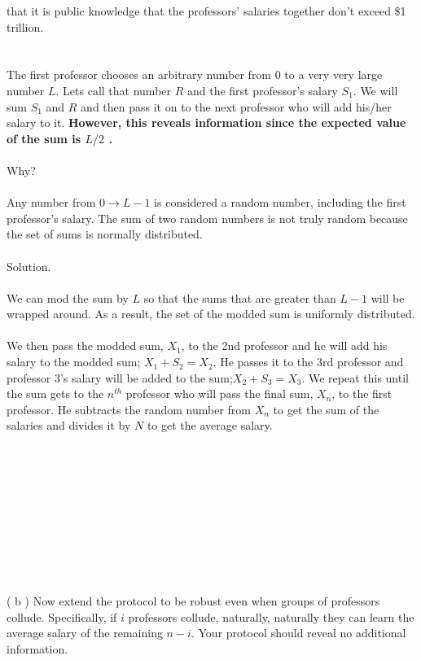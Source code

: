 \documentclass[11pt]{article}
\begin{document}
	that it is public knowledge that the professors' salaries together don't exceed \$1 trillion.
	\\\\\\
	The first professor chooses an arbitrary number from 0 to a very very large number $L$. 
	Lets call that number $R$ and the first professor's salary $S_1$.  We will sum $S_1$ and $R$ 
	and then pass it on to the next professor who will add his/her salary to it. \textbf{However, this 
	reveals information since the expected value of the sum is $L/2$ .}
	\\\\
	Why?
	\\\\
	Any number from $0\rightarrow L-1$ is considered a random number, including the first professor's salary. The sum of two random numbers is not truly random because the set of sums is normally distributed. 
	\\\\
	Solution.
	\\\\
	We can mod the sum by $L$ so that the sums that are greater than $L-1$ will be wrapped around. As a result, the set of the modded sum is uniformly distributed.
	\\\\
	We then pass the modded sum, $X_1$, to the 2nd professor and he will add his salary to the modded sum; $X_1+S_2=X_2$. He passes it to the 3rd professor and professor 3's salary will be added to the sum;$X_2+S_3=X_3$. We repeat this until the sum gets to the $n^{th}$ professor who will pass the final sum, $X_n$, to the first professor. He subtracts the random number from $X_n$ to get the sum of the salaries and divides it by $N$ to get the average salary.
	\\\\\\\\\\\\\\\\\\\\\\
	( b ) Now extend the protocol to be robust even when groups of professors collude. Specifically, if $i$ professors collude, naturally, naturally they can learn the average salary of the remaining $n - i$. Your protocol should reveal no additional information.
\end{document}
